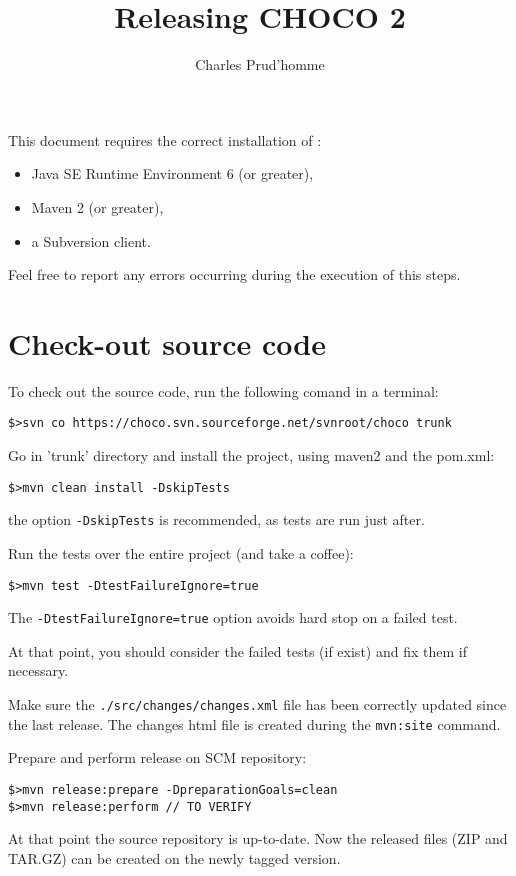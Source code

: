 \documentclass[11pt]{amsart}
\title{Releasing CHOCO 2}
\author{Charles Prud'homme}
\newcommand{\mylst}[1]{\lstinline|#1|}
\begin{document}
\maketitle

This document requires the correct installation of :
\begin{itemize}
\item Java SE Runtime Environment 6 (or greater),
\item Maven 2 (or greater),
\item a Subversion client.
\end{itemize}

Feel free to report any errors occurring during the execution of this steps.

\section{Check-out source code}

To check out the source code, run the following comand in a terminal:
\begin{lstlisting}
$>svn co https://choco.svn.sourceforge.net/svnroot/choco trunk
\end{lstlisting}

\vspace{.5cm}
Go in 'trunk' directory and install the project, using maven2 and the pom.xml:
\begin{lstlisting}
$>mvn clean install -DskipTests
\end{lstlisting}
the option \mylst{-DskipTests} is recommended, as tests are run just after. 

\vspace{.5cm}
Run the tests over the entire project (and take a coffee):
\begin{lstlisting}
$>mvn test -DtestFailureIgnore=true
\end{lstlisting}
The \mylst{-DtestFailureIgnore=true} option avoids hard stop on a failed test. 

At that point, you should consider the failed tests (if exist) and fix them if necessary. 

\vspace{.5cm}
Make sure the \mylst{./src/changes/changes.xml} file has been correctly updated since the last release. The changes html file is created during the \mylst{mvn:site} command. 

\vspace{.5cm}
Prepare and perform release on SCM repository:
\begin{lstlisting}
$>mvn release:prepare -DpreparationGoals=clean
$>mvn release:perform // TO VERIFY
\end{lstlisting}
At that point the source repository is up-to-date. Now the released files (ZIP and TAR.GZ) can be created on the newly tagged version.
\end{document}
